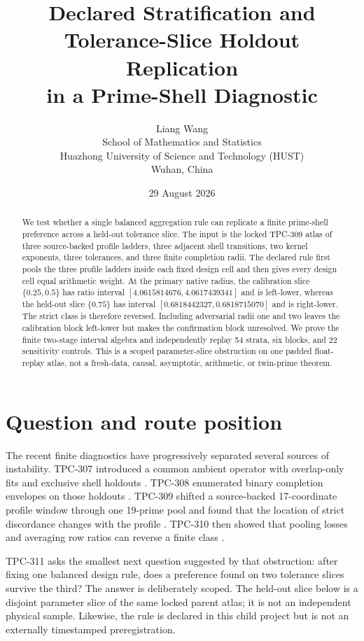 \documentclass[10pt,a4paper]{article}
\title{Declared Stratification and Tolerance-Slice Holdout Replication\\
       in a Prime-Shell Diagnostic}
\author{Liang Wang\\
School of Mathematics and Statistics\\
Huazhong University of Science and Technology (HUST)\\
Wuhan, China}
\date{29 August 2026}
\begin{document}
\maketitle

\begin{abstract}
We test whether a single balanced aggregation rule can replicate a finite
prime-shell preference across a held-out tolerance slice.  The input is the
locked TPC-309 atlas of three source-backed profile ladders, three adjacent
shell transitions, two kernel exponents, three tolerances, and three finite
completion radii.  The declared rule first pools the three profile ladders
inside each fixed design cell and then gives every design cell equal arithmetic
weight.  At the primary native radius, the calibration slice
$\{0.25,0.5\}$ has ratio interval
$[4.0615814676,4.0617439341]$ and is left-lower, whereas the held-out slice
$\{0.75\}$ has interval $[0.6818442327,0.6818715070]$ and is right-lower.
The strict class is therefore reversed.  Including adversarial radii one and
two leaves the calibration block left-lower but makes the confirmation block
unresolved.  We prove the finite two-stage interval algebra and independently
replay 54 strata, six blocks, and 22 sensitivity controls.  This is a scoped
parameter-slice obstruction on one padded float-replay atlas, not a fresh-data,
causal, asymptotic, arithmetic, or twin-prime theorem.
\end{abstract}

\section{Question and route position}

The recent finite diagnostics have progressively separated several sources of
instability.  TPC-307 introduced a common ambient operator with overlap-only
fits and exclusive shell holdouts \cite{tpc307}.  TPC-308 enumerated binary
completion envelopes on those holdouts \cite{tpc308}.  TPC-309 shifted a
source-backed 17-coordinate profile window through one 19-prime pool and found
that the location of strict discordance changes with the profile
\cite{tpc309}.  TPC-310 then showed that pooling losses and averaging row ratios
can reverse a finite class \cite{tpc310}.

TPC-311 asks the smallest next question suggested by that obstruction: after
fixing one balanced design rule, does a preference found on two tolerance
slices survive the third?  The answer is deliberately scoped.  The held-out
slice below is a disjoint parameter slice of the same locked parent atlas; it
is not an independent physical sample.  Likewise, the rule is declared in
this child project but is not an externally timestamped preregistration.
\end{document}
